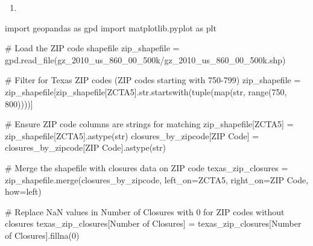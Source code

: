 \documentclass[
  letterpaper,
  DIV=11,
  numbers=noendperiod]{scrartcl}
\newenvironment{Shaded}{\begin{snugshade}}{\end{snugshade}}
\newcommand{\BuiltInTok}[1]{\textcolor[rgb]{0.00,0.23,0.31}{#1}}
\newcommand{\CommentTok}[1]{\textcolor[rgb]{0.37,0.37,0.37}{#1}}
\newcommand{\DecValTok}[1]{\textcolor[rgb]{0.68,0.00,0.00}{#1}}
\newcommand{\ImportTok}[1]{\textcolor[rgb]{0.00,0.46,0.62}{#1}}
\newcommand{\NormalTok}[1]{\textcolor[rgb]{0.00,0.23,0.31}{#1}}
\newcommand{\OperatorTok}[1]{\textcolor[rgb]{0.37,0.37,0.37}{#1}}
\newcommand{\StringTok}[1]{\textcolor[rgb]{0.13,0.47,0.30}{#1}}
\providecommand{\tightlist}{%
  \setlength{\itemsep}{0pt}\setlength{\parskip}{0pt}}\usepackage{longtable,booktabs,array}
\begin{document}
\begin{enumerate}
\def\labelenumi{\arabic{enumi}.}
\setcounter{enumi}{1}
\tightlist
\item
\end{enumerate}

\begin{Shaded}
\begin{Highlighting}[]
\ImportTok{import}\NormalTok{ geopandas }\ImportTok{as}\NormalTok{ gpd}
\ImportTok{import}\NormalTok{ matplotlib.pyplot }\ImportTok{as}\NormalTok{ plt}

\CommentTok{\# Load the ZIP code shapefile}
\NormalTok{zip\_shapefile }\OperatorTok{=}\NormalTok{ gpd.read\_file(}\StringTok{\textquotesingle{}gz\_2010\_us\_860\_00\_500k/gz\_2010\_us\_860\_00\_500k.shp\textquotesingle{}}\NormalTok{)}

\CommentTok{\# Filter for Texas ZIP codes (ZIP codes starting with 750{-}799)}
\NormalTok{zip\_shapefile }\OperatorTok{=}\NormalTok{ zip\_shapefile[zip\_shapefile[}\StringTok{\textquotesingle{}ZCTA5\textquotesingle{}}\NormalTok{].}\BuiltInTok{str}\NormalTok{.startswith(}\BuiltInTok{tuple}\NormalTok{(}\BuiltInTok{map}\NormalTok{(}\BuiltInTok{str}\NormalTok{, }\BuiltInTok{range}\NormalTok{(}\DecValTok{750}\NormalTok{, }\DecValTok{800}\NormalTok{))))]}

\CommentTok{\# Ensure ZIP code columns are strings for matching}
\NormalTok{zip\_shapefile[}\StringTok{\textquotesingle{}ZCTA5\textquotesingle{}}\NormalTok{] }\OperatorTok{=}\NormalTok{ zip\_shapefile[}\StringTok{\textquotesingle{}ZCTA5\textquotesingle{}}\NormalTok{].astype(}\BuiltInTok{str}\NormalTok{)}
\NormalTok{closures\_by\_zipcode[}\StringTok{\textquotesingle{}ZIP Code\textquotesingle{}}\NormalTok{] }\OperatorTok{=}\NormalTok{ closures\_by\_zipcode[}\StringTok{\textquotesingle{}ZIP Code\textquotesingle{}}\NormalTok{].astype(}\BuiltInTok{str}\NormalTok{)}

\CommentTok{\# Merge the shapefile with closures data on ZIP code}
\NormalTok{texas\_zip\_closures }\OperatorTok{=}\NormalTok{ zip\_shapefile.merge(closures\_by\_zipcode, left\_on}\OperatorTok{=}\StringTok{\textquotesingle{}ZCTA5\textquotesingle{}}\NormalTok{, right\_on}\OperatorTok{=}\StringTok{\textquotesingle{}ZIP Code\textquotesingle{}}\NormalTok{, how}\OperatorTok{=}\StringTok{\textquotesingle{}left\textquotesingle{}}\NormalTok{)}

\CommentTok{\# Replace NaN values in \textquotesingle{}Number of Closures\textquotesingle{} with 0 for ZIP codes without closures}
\NormalTok{texas\_zip\_closures[}\StringTok{\textquotesingle{}Number of Closures\textquotesingle{}}\NormalTok{] }\OperatorTok{=}\NormalTok{ texas\_zip\_closures[}\StringTok{\textquotesingle{}Number of Closures\textquotesingle{}}\NormalTok{].fillna(}\DecValTok{0}\NormalTok{)}


\end{Highlighting}
\end{Shaded}
\end{document}
